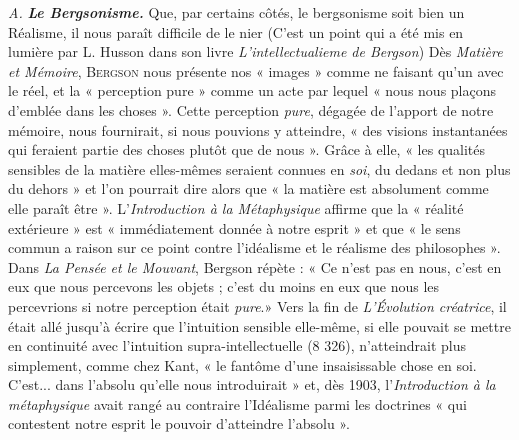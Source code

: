 {\it A.} \textbf{\textit {Le Bergsonisme.}} Que, par certains côtés, le bergsonisme soit
bien un Réalisme, il nous paraît difficile de le nier
{\scriptsize (C'est un point qui a été mis en lumière par L. Husson dans son livre
{\it L'intellectualieme de Bergson})}
Dès {\it Matière
et Mémoire}, \textsc{Bergson} nous présente nos « images » comme ne faisant
qu'un avec le réel, et la « perception pure » comme un acte par
lequel « nous nous plaçons d'emblée dans les choses ». Cette perception
{\it pure}, dégagée de l’apport de notre mémoire, nous fournirait, si nous
pouvions y atteindre, « des visions instantanées qui feraient partie
des choses plutôt que de nous ». Grâce à elle, « les qualités sensibles
de la matière elles-mêmes seraient connues en {\it soi}, du dedans et non
plus du dehors » et l’on pourrait dire alors que « la matière est absolument
comme elle paraît être ». L’{\it Introduction à la Métaphysique}
affirme que la « réalité extérieure » est « immédiatement donnée à
notre esprit » et que « le sens commun a raison sur ce point contre
l’idéalisme et le réalisme des philosophes ». Dans {\it La Pensée et le
Mouvant}, Bergson répète : « Ce n’est pas en nous, c’est en eux que nous
percevons les objets ; c’est du moins en eux que nous les percevrions
si notre perception était {\it pure}.» Vers la fin de {\it L’Évolution créatrice},
il était allé jusqu’à écrire que l’intuition sensible elle-même, si elle
pouvait se mettre en continuité avec l'intuition supra-intellectuelle
(8 326), n’atteindrait plus simplement, comme chez Kant, « le fantôme
d’une insaisissable chose en soi. C’est... dans l’absolu qu’elle nous
introduirait » et, dès 1903, l’{\it Introduction à la métaphysique} avait
rangé au contraire l’Idéalisme parmi les doctrines « qui contestent
notre esprit le pouvoir d’atteindre l'absolu ».

